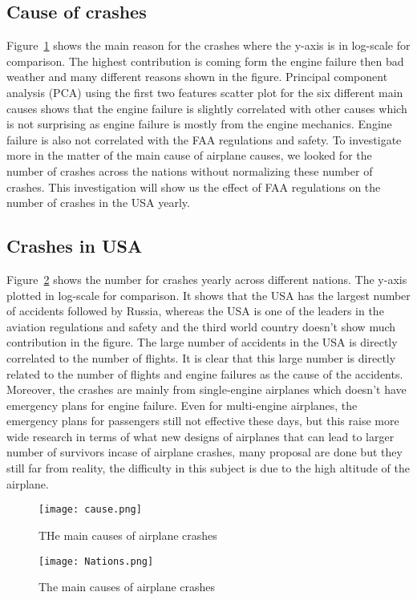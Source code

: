 \documentclass[journal]{IEEEtran}
\begin{document}
\subsection{Cause of crashes}
Figure~\ref{cause} shows the main reason for the crashes where the y-axis is in log-scale for comparison. The highest
contribution is coming form the engine failure then bad
weather and many different reasons shown in the figure. Principal component analysis (PCA) using the first two features scatter plot
for the six different main causes shows that the engine failure is slightly correlated with other causes which is not surprising as
engine failure is mostly from the engine mechanics. Engine failure is also not correlated with the FAA regulations and safety.
To investigate more in the matter of the main cause of airplane causes, we looked for the number of crashes across the nations without
normalizing these number of crashes. This investigation will show us the effect of FAA regulations on the number of crashes
in the USA yearly.

\subsection{Crashes in USA}
Figure~\ref{nation} shows the number for crashes yearly across different nations. The y-axis plotted in log-scale for
comparison. It shows that the USA has the largest number of
accidents followed by Russia, whereas the USA is one of the leaders in the aviation regulations and safety and the third world
country doesn't show much contribution in the figure. The large number of accidents in
the USA is directly correlated to the number of flights. It is clear that this large number is directly related to the number of
flights and engine failures as the cause of the accidents. Moreover, the crashes are mainly from single-engine airplanes which
doesn't have emergency plans for engine failure. Even for multi-engine airplanes, the emergency plans for passengers still not
effective these days, but this raise more wide research in terms of what new designs of airplanes that can lead to larger number of survivors
incase of airplane crashes, many proposal are done but they still far from reality, the difficulty in this subject is due to the high altitude of the airplane.




\begin{figure}
  \centering
    \texttt{[image: cause.png]}
    \caption{THe main causes of airplane crashes}\label{cause}
\end{figure}
\begin{figure}
  \centering
    \texttt{[image: Nations.png]}
    \caption{The main causes of airplane crashes}\label{nation}
\end{figure}
\end{document}
